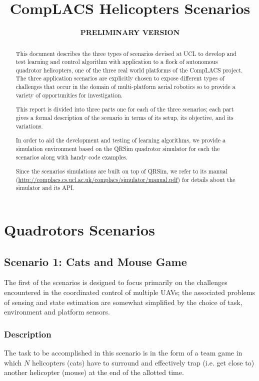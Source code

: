 \documentclass[a4paper,11pt]{report}
\title{{CompLACS} Helicopters Scenarios}
\author{\bf PRELIMINARY VERSION}
\newcommand{\sname}{QRSim\xspace}
\newcommand{\webman}{\url{http://complacs.cs.ucl.ac.uk/complacs/simulator/manual.pdf}\xspace}
\begin{document}
\maketitle



\begin{abstract}
This document describes the three types of scenarios devised at UCL to develop and test learning and control algorithm with application to a flock of autonomous quadrotor helicopters, one of the three real world platforms of the {CompLACS} project.
The three application scenarios are explicitly chosen to expose different types of challenges that occur in the domain of multi-platform aerial robotics so to provide a variety of opportunities for investigation.

This report is divided into three parts one for each of the three scenarios; each part gives a formal description of the scenario in terms of its setup, its objective, and its variations. 

In order to aid the development and testing of learning algorithms, we provide a simulation environment based on the \sname quadrotor simulator for each the scenarios along with handy code examples.

Since the scenarios simulations are built on top of \sname, we refer to its manual (\webman) for details about the simulator and its API.

\end{abstract}

\tableofcontents

\chapter{Quadrotors Scenarios}

\section{Scenario 1: Cats and Mouse Game}

The first of the scenarios is designed to focus primarily on the challenges encountered in the coordinated control of multiple UAVs; the associated problems of sensing and state estimation are somewhat simplified by the choice of task, environment and platform sensors. 

\subsection{Description}
The task to be accomplished in this scenario is in the form of a team game in which $N$ helicopters (cats) have to surround and effectively trap (i.e. get close to) another helicopter (mouse) at the end of the allotted time. 
\end{document}

